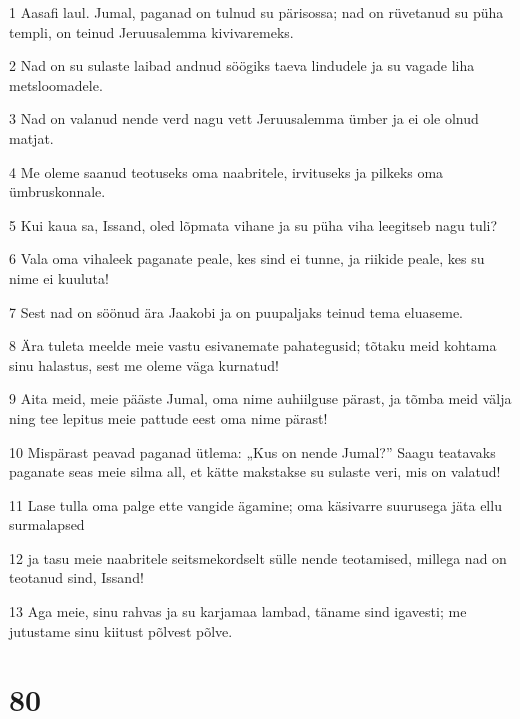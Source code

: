 \par 1 Aasafi laul. Jumal, paganad on tulnud su pärisossa; nad on rüvetanud su püha templi, on teinud Jeruusalemma kivivaremeks.
\par 2 Nad on su sulaste laibad andnud söögiks taeva lindudele ja su vagade liha metsloomadele.
\par 3 Nad on valanud nende verd nagu vett Jeruusalemma ümber ja ei ole olnud matjat.
\par 4 Me oleme saanud teotuseks oma naabritele, irvituseks ja pilkeks oma ümbruskonnale.
\par 5 Kui kaua sa, Issand, oled lõpmata vihane ja su püha viha leegitseb nagu tuli?
\par 6 Vala oma vihaleek paganate peale, kes sind ei tunne, ja riikide peale, kes su nime ei kuuluta!
\par 7 Sest nad on söönud ära Jaakobi ja on puupaljaks teinud tema eluaseme.
\par 8 Ära tuleta meelde meie vastu esivanemate pahategusid; tõtaku meid kohtama sinu halastus, sest me oleme väga kurnatud!
\par 9 Aita meid, meie pääste Jumal, oma nime auhiilguse pärast, ja tõmba meid välja ning tee lepitus meie pattude eest oma nime pärast!
\par 10 Mispärast peavad paganad ütlema: „Kus on nende Jumal?” Saagu teatavaks paganate seas meie silma all, et kätte makstakse su sulaste veri, mis on valatud!
\par 11 Lase tulla oma palge ette vangide ägamine; oma käsivarre suurusega jäta ellu surmalapsed
\par 12 ja tasu meie naabritele seitsmekordselt sülle nende teotamised, millega nad on teotanud sind, Issand!
\par 13 Aga meie, sinu rahvas ja su karjamaa lambad, täname sind igavesti; me jutustame sinu kiitust põlvest põlve.

\chapter{80}

